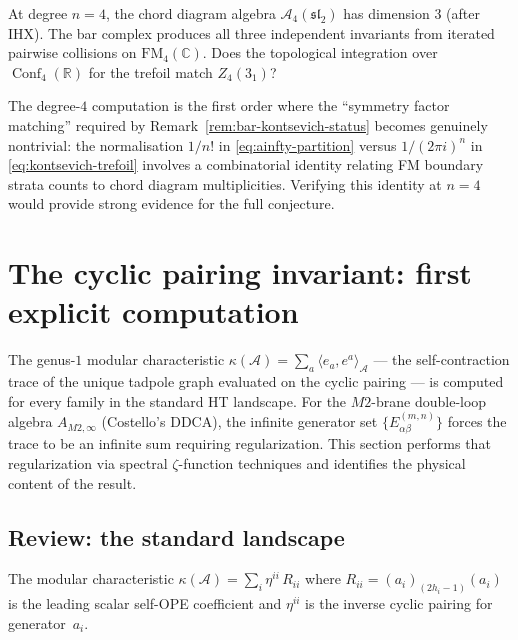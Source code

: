 \documentclass[11pt]{article}
\newcommand{\cA}{\mathcal{A}}
\newcommand{\fsl}{\mathfrak{sl}}
\newcommand{\C}{\mathbb{C}}
\newcommand{\R}{\mathbb{R}}
\newcommand{\FM}{\mathrm{FM}}
\DeclareMathOperator{\Conf}{Conf}
\begin{document}
\begin{question}
\label{q:degree-4-trefoil}
At degree $n = 4$, the chord diagram algebra $\cA_4(\fsl_2)$
has dimension $3$ (after IHX).  The bar complex produces
all three independent invariants from iterated pairwise
collisions on $\FM_4(\C)$.  Does the topological integration
over $\Conf_4(\R)$ for the trefoil match $Z_4(3_1)$?

The degree-$4$ computation is the first order where the
``symmetry factor matching'' required by
Remark~\ref{rem:bar-kontsevich-status} becomes genuinely
nontrivial: the normalisation $1/n!$ in
\eqref{eq:ainfty-partition} versus $1/(2\pi i)^n$ in
\eqref{eq:kontsevich-trefoil} involves a combinatorial
identity relating FM boundary strata counts to chord diagram
multiplicities.  Verifying this identity at $n = 4$ would
provide strong evidence for the full conjecture.
\end{question}





\section{The cyclic pairing invariant: first explicit computation}
\label{sec:cyclic-pairing-invariant}

The genus-$1$ modular characteristic
$\kappa(\cA) = \sum_a \langle e_a, e^a \rangle_\cA$
--- the self-contraction trace of the unique tadpole graph
evaluated on the cyclic pairing --- is computed for every family
in the standard HT landscape.
For the $M2$-brane double-loop algebra $A_{M2,\infty}$
(Costello's DDCA), the infinite generator set
$\{E^{(m,n)}_{\alpha\beta}\}$ forces the trace to be an infinite
sum requiring regularization.  This section performs that
regularization via spectral $\zeta$-function techniques and
identifies the physical content of the result.

\subsection{Review: the standard landscape}

The modular characteristic
$\kappa(\cA) = \sum_i \eta^{ii}\, R_{ii}$
where $R_{ii} = (a_i)_{(2h_i-1)}(a_i)$ is the leading scalar
self-OPE coefficient and $\eta^{ii}$ is the inverse cyclic
pairing for generator~$a_i$.
\end{document}
